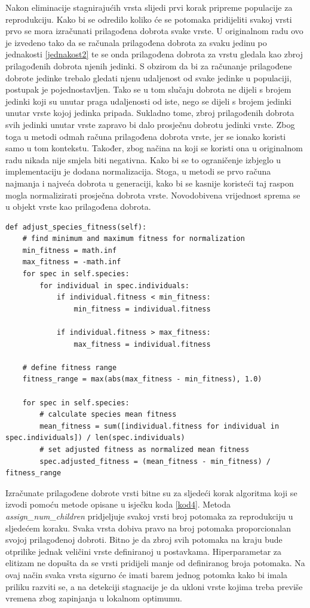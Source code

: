 \documentclass[times, utf8, diplomski, numeric]{fer}
\begin{document}
Nakon eliminacije stagnirajućih vrsta slijedi prvi korak pripreme populacije za reprodukciju. Kako bi se odredilo koliko će se potomaka pridijeliti svakoj vrsti prvo se mora izračunati prilagođena dobrota svake vrste. U originalnom radu \citep{rad5} ovo je izvedeno tako da se računala prilagođena dobrota za svaku jedinu po jednakosti \ref{jednakost2} te se onda prilagođena dobrota za vrstu gledala kao zbroj prilagođenih dobrota njenih jedinki. S obzirom da bi za računanje prilagođene dobrote jedinke trebalo gledati njenu udaljenost od svake jedinke u populaciji, postupak je pojednostavljen. Tako se u tom slučaju dobrota ne dijeli s brojem jedinki koji su unutar praga udaljenosti od iste, nego se dijeli s brojem jedinki unutar vrste kojoj jedinka pripada. Sukladno tome, zbroj prilagođenih dobrota svih jedinki unutar vrste zapravo bi dalo prosječnu dobrotu jedinki vrste. Zbog toga u metodi odmah računa prilagođena dobrota vrste, jer se ionako koristi samo u tom kontekstu. Također, zbog načina na koji se koristi ona u originalnom radu nikada nije smjela biti negativna. Kako bi se to ograničenje izbjeglo u implementaciju je dodana normalizacija. Stoga, u metodi se prvo računa najmanja i najveća dobrota u generaciji, kako bi se kasnije koristeći taj raspon mogla normalizirati prosječna dobrota vrste. Novodobivena vrijednost sprema se u objekt vrste kao prilagođena dobrota.

\begin{lstlisting}[frame=single, label=kod3, caption=Izvorni tekst metode \textit{adjust\_species\_fitness} u klasi \textit{Population}]
def adjust_species_fitness(self):
	# find minimum and maximum fitness for normalization
	min_fitness = math.inf
	max_fitness = -math.inf
	for spec in self.species:
		for individual in spec.individuals:
			if individual.fitness < min_fitness:
				min_fitness = individual.fitness

			if individual.fitness > max_fitness:
				max_fitness = individual.fitness

	# define fitness range
	fitness_range = max(abs(max_fitness - min_fitness), 1.0)

	for spec in self.species:
		# calculate species mean fitness
		mean_fitness = sum([individual.fitness for individual in spec.individuals]) / len(spec.individuals)
		# set adjusted fitness as normalized mean fitness
		spec.adjusted_fitness = (mean_fitness - min_fitness) / fitness_range
\end{lstlisting}

Izračunate prilagođene dobrote vrsti bitne su za sljedeći korak algoritma koji se izvodi pomoću metode opisane u isječku koda \ref{kod4}. Metoda \textit{assign\_num\_children} pridjeljuje svakoj vrsti broj potomaka za reprodukciju u sljedećem koraku. Svaka vrsta dobiva pravo na broj potomaka proporcionalan svojoj prilagođenoj dobroti. Bitno je da zbroj svih potomaka na kraju bude otprilike jednak veličini vrste definiranoj u postavkama. Hiperparametar za elitizam ne dopušta da se vrsti pridijeli manje od definiranog broja potomaka. Na ovaj način svaka vrsta sigurno će imati barem jednog potomka kako bi imala priliku razviti se, a na detekciji stagnacije je da ukloni vrste kojima treba previše vremena zbog zapinjanja u lokalnom optimumu.
\end{document}
